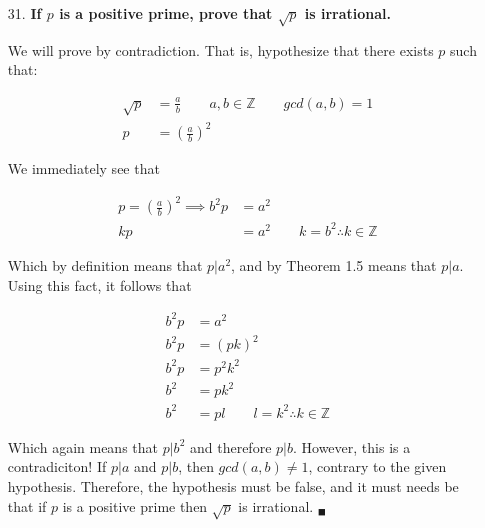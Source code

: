 \documentclass{article}
\begin{document}
\begin{enumerate}
		\item[31.]	\textbf{If $p$ is a positive prime, prove that $\sqrt{p}$ is irrational.}

					We will prove by contradiction. That is, hypothesize that there exists $p$ such 
					that:

					\begin{align*}
						\sqrt{p} &= \frac{a}{b} \qquad a, b \in \mathbb{Z} \qquad gcd(a, b) = 1 \\
						p &= (\frac{a}{b})^2
					\end{align*}

					We immediately see that 

					\begin{align*}
						p = (\frac{a}{b})^2 \implies b^2p &= a^2 \\
						kp &= a^2 \qquad k = b^2 \therefore k \in \mathbb{Z}
					\end{align*}

					Which by definition means that $p | a^2$, and by Theorem 1.5 means that $p | a$.
					Using this fact, it follows that

					\begin{align*}
						b^2p &= a^2 \\
						b^2p &= (pk)^2 \\
						b^2p &= p^2k^2 \\
						b^2 &= pk^2 \\
						b^2 &= pl \qquad l = k^2 \therefore k \in \mathbb{Z}
					\end{align*}

					Which again means that $p | b^2$ and therefore $p | b$. However, this is a 
					contradiciton! If $p | a$ and $p | b$, then $gcd(a, b) \neq 1$, contrary to the 
					given hypothesis. Therefore, the hypothesis must be false, and it must needs be 
					that if $p$ is a positive prime then $\sqrt{p}$ is irrational. 
					$_{\blacksquare}$

	\end{enumerate}
\end{document}
